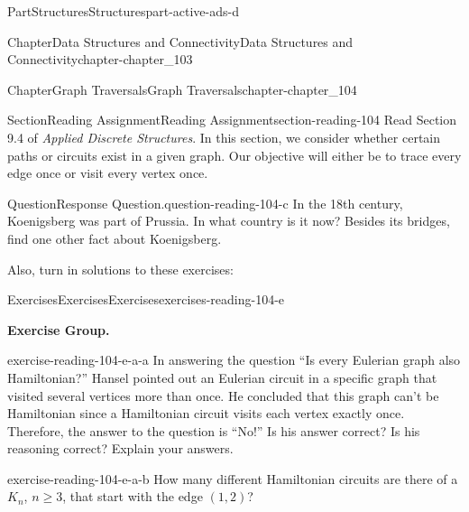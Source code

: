 \documentclass[oneside,10pt,]{book}
\numberwithin{equation}{section}
\begin{document}
\begin{partptx}{Part}{Structures}{}{Structures}{}{}{part-active-ads-d}
\begin{chapterptx}{Chapter}{Data Structures and Connectivity}{}{Data Structures and Connectivity}{}{}{chapter-chapter_103}
\end{chapterptx}
%
\typeout{************************************************}
\typeout{************************************************}
%
\begin{chapterptx}{Chapter}{Graph Traversals}{}{Graph Traversals}{}{}{chapter-chapter_104}
\renewcommand*{\chaptername}{Chapter}
\index{}%
%
%
\typeout{************************************************}
\typeout{************************************************}
%
\begin{sectionptx}{Section}{Reading Assignment}{}{Reading Assignment}{}{}{section-reading-104}
Read Section 9.4 of \emph{Applied Discrete Structures}.  In this section, we consider whether certain paths or circuits exist in a given graph.  Our objective will either be to trace every edge once or visit every vertex once.%
\begin{question}{Question}{Response Question.}{question-reading-104-c}%
In the 18th century, Koenigsberg was  part of Prussia. In what country is it now? Besides its bridges, find one other fact about Koenigsberg.%
\end{question}
Also, turn in solutions to these exercises:%
%
%
\typeout{************************************************}
\typeout{************************************************}
%
\begin{exercises-subsection-numberless}{Exercises}{Exercises}{}{Exercises}{}{}{exercises-reading-104-e}
\par\medskip\noindent%
\textbf{Exercise Group.}\space\space%
\begin{exercisegroup}
\begin{divisionexerciseeg}{1}{}{}{exercise-reading-104-e-a-a}%
In answering the question ``Is every Eulerian graph also Hamiltonian?'' Hansel pointed out an Eulerian circuit in a specific graph that visited several vertices more than once.  He concluded that this graph can't be Hamiltonian since a Hamiltonian circuit visits each vertex exactly once. Therefore, the answer to the question is ``No!'' Is his answer correct? Is his reasoning correct?  Explain your answers.%
\end{divisionexerciseeg}%
\begin{divisionexerciseeg}{2}{}{}{exercise-reading-104-e-a-b}%
How many different Hamiltonian circuits are there of a \(K_n\), \(n \geq 3\), that start with the edge \((1,2)\)?%
\end{divisionexerciseeg}%

\end{exercisegroup}
\end{exercises-subsection-numberless}
\end{sectionptx}
\end{chapterptx}
\end{partptx}
\end{document}

